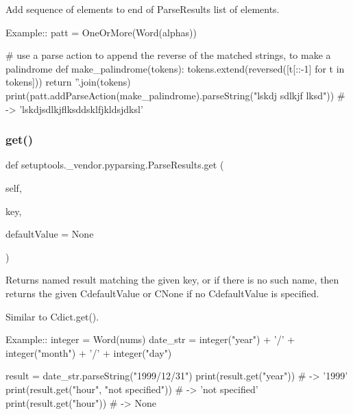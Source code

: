 \begin{DoxyVerb}Add sequence of elements to end of ParseResults list of elements.

Example::
    patt = OneOrMore(Word(alphas))
    
    # use a parse action to append the reverse of the matched strings, to make a palindrome
    def make_palindrome(tokens):
tokens.extend(reversed([t[::-1] for t in tokens]))
return ''.join(tokens)
    print(patt.addParseAction(make_palindrome).parseString("lskdj sdlkjf lksd")) # -> 'lskdjsdlkjflksddsklfjkldsjdksl'
\end{DoxyVerb}
 \mbox{\label{classsetuptools_1_1__vendor_1_1pyparsing_1_1_parse_results_a66c45d8a20af6e843c91db8054b7496f}} 
\subsubsection{\texorpdfstring{get()}{get()}}
{\footnotesize\ttfamily def setuptools.\+\_\+vendor.\+pyparsing.\+Parse\+Results.\+get (\begin{DoxyParamCaption}\item[{}]{self,  }\item[{}]{key,  }\item[{}]{default\+Value = {\ttfamily None} }\end{DoxyParamCaption})}

\begin{DoxyVerb}Returns named result matching the given key, or if there is no
such name, then returns the given C{defaultValue} or C{None} if no
C{defaultValue} is specified.

Similar to C{dict.get()}.

Example::
    integer = Word(nums)
    date_str = integer("year") + '/' + integer("month") + '/' + integer("day")           

    result = date_str.parseString("1999/12/31")
    print(result.get("year")) # -> '1999'
    print(result.get("hour", "not specified")) # -> 'not specified'
    print(result.get("hour")) # -> None
\end{DoxyVerb}
 \mbox{\label{classsetuptools_1_1__vendor_1_1pyparsing_1_1_parse_results_ab2ae7e5ea94c1e158d059aa90172f666}} 
